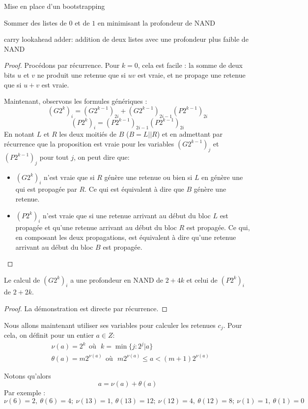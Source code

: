 \begin{section}{Mise en place d'un bootstrapping}
\begin{subsection}{Sommer des listes de $0$ et de $1$ en minimisant la profondeur de NAND}
\begin{subsubsection}{carry lookahead adder: addition de deux listes avec une profondeur plus faible de NAND}
\begin{proof}
	Procédons par récurrence. Pour $k = 0$, cela est facile : la somme de deux bits $u$ et $v$ ne produit une retenue que si $uv$ est vraie, et ne propage une retenue que si $u+v$ est vraie.

	Maintenant, observons les formules génériques :
\[{(G2^k)_i} = {(G2^{k-1})_{2i}} + {(G2^{k-1})_{2i-1}}{(P2^{k-1})_{2i}}\]
\[{(P2^{k})_i} = {(P2^{k-1})_{2i-1}} {(P2^{k-1})_{2i}} \]
En notant $L$ et $R$ les deux moitiés de $B$ ($B = L||R$) et en admettant par récurrence 
que la proposition est vraie pour les variables ${(G2^{k-1})}_j$ et ${(P2^{k-1})}_j$ pour tout $j$, on peut dire que:
\begin{itemize}
\item $(G2^k)_i$ n'est vraie que si $R$ génère une retenue ou bien si $L$ en génère une qui est propagée par $R$. Ce qui est équivalent à dire que $B$ génère une retenue.
\item $(P2^{k})_i$ n'est vraie que si une retenue arrivant au début du bloc $L$ est propagée et qu'une retenue arrivant au début du bloc $R$ est propagée. Ce qui, en composant les deux propagations, est équivalent à dire qu'une retenue arrivant au début du bloc $B$ est propagée.  
\end{itemize}
\end{proof}

\begin{prop} \label{g_et_p}
Le calcul de $(G2^k)_i$ a une profondeur en NAND de $2 + 4k$ et celui de $(P2^k)_i$ de $2 + 2k$.
\end{prop}

\begin{proof}
	La démonstration est directe par récurrence. 
\end{proof}

Nous allons maintenant utiliser ses variables pour calculer les retenues $c_j$.
Pour cela, on définit pour un entier $a \in Z$:
\begin{align*}
	&\nu(a) = 2^k\:\: \text{où} \:\:\: k = \min\{j: 2^j | a\} \\
	&\theta(a) = m 2^{\nu(a)}\:\: \text{où}\:\:\: m 2^{\nu(a)} \leqslant a < (m+1) 2^{\nu(a)}
\end{align*}

	Notons qu'alors \[a = \nu(a) + \theta(a)\] Par exemple :
\[\nu(6) = 2,\ \theta(6) = 4;\ \nu(13) = 1,\ \theta(13) = 12;\ \nu(12)= 4,\ \theta(12) = 8;\ \nu(1) = 1,\ \theta(1) = 0\]

\paragraph{}


\end{subsubsection}
\end{subsection}
\end{section}
